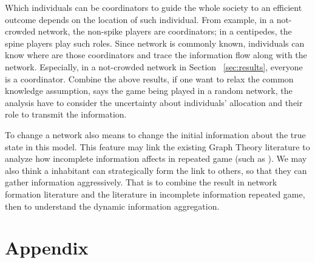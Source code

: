 \documentclass[12pt,letter]{article}
\theoremstyle{definition}
\theoremstyle{remark}
\theoremstyle{claim}
\begin{document}
Which individuals can be coordinators to guide the whole society to an efficient outcome depends on the location of such individual. From example, in a not-crowded network, the non-spike players are coordinators; in a centipedes, the spine players play such roles. Since network is commonly known, individuals can know where are those coordinators and trace the information flow along with the network. Especially, in a not-crowded network in Section ~\ref{sec:results}, everyone is a coordinator. Combine the above results, if one want to relax the common knowledge assumption, says the game being played in a random network, the analysis have to consider the uncertainty about individuals' allocation and their role to transmit the information. 

To change a network also means to change the initial information about the true state in this model. This feature may link the existing Graph Theory literature to analyze how incomplete information affects in repeated game (such as \cite{sorin1996}).  We may also think a inhabitant can strategically form the link to others, so that they can gather information aggressively. That is to combine the result in network formation literature \cite{JAsurvey2003} and the literature in incomplete information repeated game, then to understand the dynamic information aggregation.



\appendix
\section{Appendix}
\end{document}
